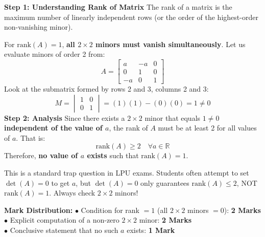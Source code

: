 \begin{solutionbox}
\textbf{Step 1: Understanding Rank of Matrix}
The rank of a matrix is the maximum number of linearly independent rows (or the order of the highest-order non-vanishing minor).

For $\text{rank}(A) = 1$, \textbf{all $2\times 2$ minors must vanish simultaneously}.
Let us evaluate minors of order 2 from:
\[
A = \begin{bmatrix} a & -a & 0 \\ 0 & 1 & 0 \\ -a & 0 & 1 \end{bmatrix}
\]
Look at the submatrix formed by rows 2 and 3, columns 2 and 3:
\[
M = \begin{vmatrix} 1 & 0 \\ 0 & 1 \end{vmatrix} = (1)(1) - (0)(0) = 1 \neq 0
\]
\textbf{Step 2: Analysis}
Since there exists a $2\times 2$ minor that equals $1 \neq 0$ \textbf{independent of the value of $a$}, the rank of $A$ must be at least 2 for all values of $a$. That is:
\[
\text{rank}(A) \ge 2 \quad \forall a \in \mathbb{R}
\]
Therefore, \textbf{no value of $a$ exists} such that $\text{rank}(A) = 1$.

\begin{examinertip}
This is a standard trap question in LPU exams. Students often attempt to set $\det(A) = 0$ to get $a$, but $\det(A) = 0$ only guarantees $\text{rank}(A) \le 2$, NOT $\text{rank}(A) = 1$. Always check $2\times 2$ minors!
\end{examinertip}

\begin{markingrubric}
\textbf{Mark Distribution:}
$\bullet$ Condition for rank $= 1$ (all $2\times 2$ minors $= 0$): \textbf{2 Marks}\\
$\bullet$ Explicit computation of a non-zero $2\times 2$ minor: \textbf{2 Marks}\\
$\bullet$ Conclusive statement that no such $a$ exists: \textbf{1 Mark}
\end{markingrubric}
\end{solutionbox}

